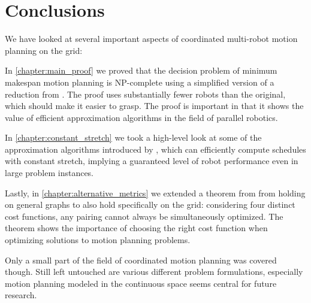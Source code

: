 
\section{Conclusions}

We have looked at several important aspects of coordinated multi-robot motion planning on the grid:

In \cref{chapter:main_proof} we proved that the decision problem of minimum makespan motion planning is NP-complete using a simplified version of a reduction from \cite{siamcomp/DemaineFKMS19}. 
The proof uses substantially fewer robots than the original, which should make it easier to grasp. 
The proof is important in that it shows the value of efficient approximation algorithms in the field of parallel robotics. 

In \cref{chapter:constant_stretch} we took a high-level look at some of the approximation algorithms introduced by \cite{siamcomp/DemaineFKMS19}, which can efficiently compute schedules with constant stretch, implying a guaranteed level of robot performance even in large problem instances.

Lastly, in \cref{chapter:alternative_metrics} we extended a theorem from \cite{corr/YuL15c} from holding on general graphs to also hold specifically on the grid: considering four distinct cost functions, any pairing cannot always be simultaneously optimized.
The theorem shows the importance of choosing the right cost function when optimizing solutions to motion planning problems. 

Only a small part of the field of coordinated motion planning was covered though. 
Still left untouched are various different problem formulations, especially motion planning modeled in the continuous space seems central for future research.
